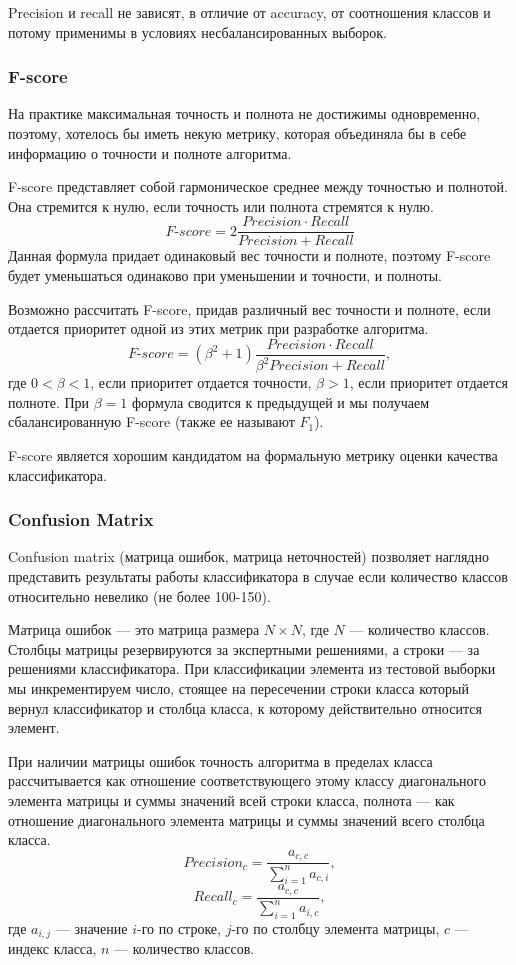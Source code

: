 \documentclass[14pt, a4paper, oneside]{extarticle}
\begin{document}
Precision и recall не зависят, в отличие от accuracy, от соотношения классов и потому применимы в условиях несбалансированных выборок.

\subsubsection{F-score}
На практике максимальная точность и полнота не достижимы одновременно, поэтому, хотелось бы иметь некую метрику, которая объединяла бы в себе информацию о точности и полноте алгоритма.

F-score представляет собой гармоническое среднее между точностью и полнотой. Она стремится к нулю, если точность или полнота стремятся к нулю.
$$F\mbox{-}score = 2 \frac{Precision \cdot Recall}{Precision + Recall}$$
Данная формула придает одинаковый вес точности и полноте, поэтому F-score будет уменьшаться одинаково при уменьшении и точности, и полноты.

Возможно рассчитать F-score, придав различный вес точности и полноте, если отдается приоритет одной из этих метрик при разработке алгоритма.
$$F\mbox{-}score = (\beta^2 + 1) \frac{Precision \cdot Recall}{\beta^2 Precision + Recall},$$
где $0 < \beta < 1$, если приоритет отдается точности, $\beta > 1$, если приоритет отдается полноте. При $\beta = 1$ формула сводится к предыдущей и мы получаем сбалансированную F-score (также ее называют $F_1$).

F-score является хорошим кандидатом на формальную метрику оценки качества классификатора.

\subsubsection{Confusion Matrix}
Confusion matrix (матрица ошибок, матрица неточностей) позволяет наглядно представить результаты работы классификатора в случае если количество классов относительно невелико (не более 100-150).

Матрица ошибок --- это матрица размера $N \times N$, где $N$ --- количество классов. Столбцы матрицы резервируются за экспертными решениями, а строки --- за решениями классификатора. При классификации элемента из тестовой выборки мы инкрементируем число, стоящее на пересечении строки класса который вернул классификатор и столбца класса, к которому действительно относится элемент.

При наличии матрицы ошибок точность алгоритма в пределах класса рассчитывается как отношение соответствующего этому классу диагонального элемента матрицы и суммы значений всей строки класса, полнота --- как отношение диагонального элемента матрицы и суммы значений всего столбца класса.
$$Precision_c = \frac{a_{c,c}}{\sum_{i=1}^{n} a_{c,i}},$$
$$Recall_c = \frac{a_{c,c}}{\sum_{i=1}^{n} a_{i,c}},$$
где $a_{i,j}$ --- значение $i$-го по строке, $j$-го по столбцу элемента матрицы, $c$ --- индекс класса, $n$ --- количество классов.
\end{document}
